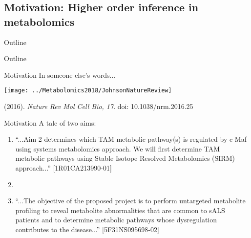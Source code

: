 \documentclass[xcolor=dvipsnames]{beamer}
\begin{document}
\subsection{Motivation: Higher order inference in metabolomics}
\begin{frame}{Outline}
	\vspace{-10.5pt}
	\tableofcontents[currentsection,subsectionstyle=hide]
\end{frame}

\begin{frame}{Outline}
	\vspace{-10.5pt}
	\tableofcontents[currentsection,subsectionstyle=show/shaded/hide]
\end{frame}

\begin{frame}{Motivation}
	\vspace{-15.5pt}
	{\LARGE In someone else's words...}
	\begin{center}
		\texttt{[image: ../Metabolomics2018/JohnsonNatureReview]}
	\end{center}
	(2016). \emph{Nature Rev Mol Cell Bio, 17}. doi: 10.1038/nrm.2016.25
\end{frame}

\begin{frame}{Motivation}
	\vspace{-10pt}
		{\LARGE A tale of two aims:}
		
		\begin{enumerate}[{1)}]
			\item ``...Aim 2 determines which TAM metabolic pathway(s) is regulated by c-Maf using systems metabolomics approach. We will first determine TAM metabolic pathways using Stable Isotope Resolved Metabolomics (SIRM) approach...'' [1R01CA213990-01] \pause
			\item[]
			\item ``...The objective of the proposed project is to perform untargeted metabolite profiling to reveal metabolite abnormalities that are common to sALS patients and to determine metabolic pathways whose dysregulation contributes to the disease...'' [5F31NS095698-02]
		\end{enumerate}
\end{frame}
\end{document}
